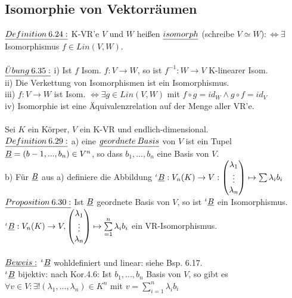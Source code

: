 \documentclass[fleqn, a4paper, 11pt]{article}
\begin{document}
\subsection{Isomorphie von Vektorr\"aumen}

$\uline{Definition\:6.24:}$ K-VR'e $V$ und $W$ hei\ss{}en $\uline{isomorph}$ (schreibe $V\simeq W$)$:\Leftrightarrow\exists$ Isomorphismus $f\in Lin(V,W)$.\\
\\
$\uline{\ddot{U}bung\:6.35:}$ i) Ist $f$ Isom. $f:V\rightarrow W$, so ist $f^{-1}:W\rightarrow V$ K-linearer Isom.\\
ii) Die Verkettung von Isomorphismen ist ein Isomorphismus.\\
iii) $f:V\rightarrow W$ ist Isom. $\Leftrightarrow\exists g\in Lin(V,W)$ mit $f\circ g=id_W \wedge g\circ f=id_V$\\
iv) Isomorphie ist eine \"Aquivalenzrelation auf der Menge aller VR'e.\\
\\
Sei $K$ ein K\"orper, $V$ ein K-VR und endlich-dimensional.\\
$\uline{Definition\:6.29:}$ a) eine $\uline{geordnete\:Basis}$ von $V$ ist ein Tupel $\uline{B}=(b-1,...,b_n)\in V^n$, so dass $b_1,...,b_n$ eine Basis von $V$.\\
b) F\"ur $\uline{B}$ aus a) definiere die Abbildung $^\iota\uline{B}:V_n(K)\rightarrow V:\begin{pmatrix}
	\lambda_1\\
	\vdots\\
	\lambda_n
\end{pmatrix} \mapsto \sum \lambda_i b_i$\\
$\uline{Proposition\:6.30:}$ Ist $\uline{B}$ geordnete Basis von $V$, so ist $^\iota\uline{B}$ ein Isomorphismus. $^\iota\uline{B}:V_n(K)\rightarrow V,\begin{pmatrix}
	\lambda_1\\
	\vdots\\
	\lambda_n
\end{pmatrix} \mapsto \sum\limits_{=1}^n \lambda_i b_i$ ein VR-Isomorphismus.\\
\\
$\uline{Beweis:}$ $^\iota\uline{B}$ wohldefiniert und linear: siehe Bsp. 6.17.\\
$^\iota\uline{B}$ bijektiv: nach Kor.4.6: Ist $b_1,...,b_n$ Basis von $V$, so gibt es $\forall v\in V:\exists!(\lambda_1,...,\lambda_n)\in K^n$ mit $v=\sum\limits_{i=1}^n \lambda_i b_i$\\
\end{document}
